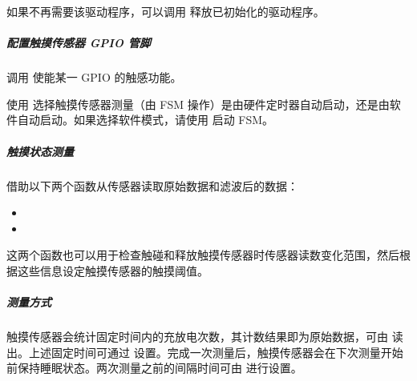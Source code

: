 \documentclass[a4paper,12pt,english]{sphinxmanual}
\begin{document}
{{\sphinxAtStartPar
如果不再需要该驱动程序，可以调用  释放已初始化的驱动程序。


\subparagraph{配置触摸传感器 GPIO 管脚}
\label{\detokenize{exp-esp32/peripherals/touch:gpio}}
\sphinxAtStartPar
调用  使能某一 GPIO 的触感功能。

\sphinxAtStartPar
使用  选择触摸传感器测量（由 FSM 操作）是由硬件定时器自动启动，还是由软件自动启动。如果选择软件模式，请使用  启动 FSM。


\subparagraph{触摸状态测量}
\label{\detokenize{exp-esp32/peripherals/touch:id3}}
\sphinxAtStartPar
借助以下两个函数从传感器读取原始数据和滤波后的数据：
\begin{itemize}
\item {} 
\sphinxAtStartPar
{}

\item {} 
\sphinxAtStartPar
{}

\end{itemize}

\sphinxAtStartPar
这两个函数也可以用于检查触碰和释放触摸传感器时传感器读数变化范围，然后根据这些信息设定触摸传感器的触摸阈值。
\begin{quote}

\sphinxAtStartPar
{}

\sphinxAtStartPar
{}
\end{quote}


\subparagraph{测量方式}
\label{\detokenize{exp-esp32/peripherals/touch:id4}}
\sphinxAtStartPar
触摸传感器会统计固定时间内的充放电次数，其计数结果即为原始数据，可由  读出。上述固定时间可通过  设置。完成一次测量后，触摸传感器会在下次测量开始前保持睡眠状态。两次测量之前的间隔时间可由  进行设置。
\begin{quote}

\sphinxAtStartPar
{}

\sphinxAtStartPar
{}
\end{quote}


}}
\end{document}

